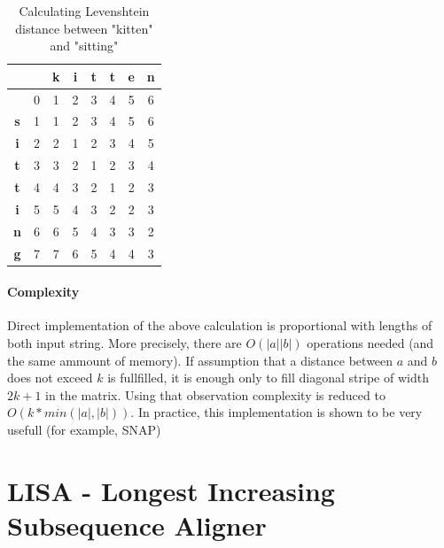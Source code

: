 \documentclass[times, utf8, diplomski]{fer}
\begin{document}
\begin{table}[H]
\centering
\small
\begin{tabular}{|c|c|c|c|c|c|c|c|}
\hline
	   &   & \textbf{k} & \textbf{i} & \textbf{t} & \textbf{t} & \textbf{e} & \textbf{n}\\
\hline
	   & 0 & 1 & 2 & 3 & 4 & 5 & 6\\
\hline
	 \textbf{s} & 1 & 1 & 2 & 3 & 4 & 5 & 6\\
\hline
	 \textbf{i} & 2 & 2 & 1 & 2 & 3 & 4 & 5\\
\hline
	 \textbf{t} & 3 & 3 & 2 & 1 & 2 & 3 & 4\\
\hline
	 \textbf{t} & 4 & 4 & 3 & 2 & 1 & 2 & 3\\
\hline
	 \textbf{i} & 5 & 5 & 4 & 3 & 2 & 2 & 3\\
\hline
	 \textbf{n} & 6 & 6 & 5 & 4 & 3 & 3 & 2\\
\hline
	 \textbf{g} & 7 & 7 & 6 & 5 & 4 & 4 & 3\\
\hline

\end{tabular}
\caption{Calculating Levenshtein distance between "kitten" and "sitting"}\label{levenshtein.table}
\end{table}

\subsubsection{Complexity}
Direct implementation of the above calculation is proportional with lengths of both input string. More precisely, there are $O(|a||b|)$ operations needed (and the same ammount of memory). If assumption that a distance between $a$ and $b$ does not exceed $k$ is fullfilled, it is enough only to fill diagonal stripe of width $2k+1$ in the matrix. Using that observation complexity is reduced to $O(k*min(|a|,|b|))$. In practice, this implementation is shown to be very usefull (for example, SNAP\cite{SNAP})


\chapter{LISA - Longest Increasing Subsequence Aligner}
\end{document}
